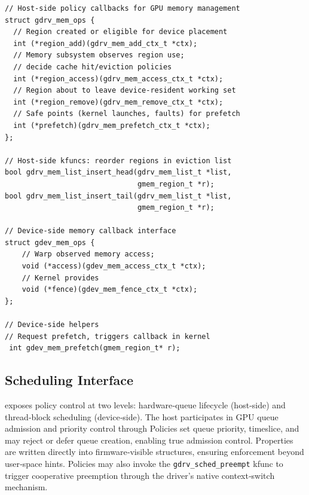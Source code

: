 \begin{verbatim}
// Host-side policy callbacks for GPU memory management
struct gdrv_mem_ops {
  // Region created or eligible for device placement
  int (*region_add)(gdrv_mem_add_ctx_t *ctx);
  // Memory subsystem observes region use;
  // decide cache hit/eviction policies
  int (*region_access)(gdrv_mem_access_ctx_t *ctx);
  // Region about to leave device-resident working set
  int (*region_remove)(gdrv_mem_remove_ctx_t *ctx);
  // Safe points (kernel launches, faults) for prefetch
  int (*prefetch)(gdrv_mem_prefetch_ctx_t *ctx);
};

// Host-side kfuncs: reorder regions in eviction list
bool gdrv_mem_list_insert_head(gdrv_mem_list_t *list,
                               gmem_region_t *r);
bool gdrv_mem_list_insert_tail(gdrv_mem_list_t *list,
                               gmem_region_t *r);

// Device-side memory callback interface
struct gdev_mem_ops {
    // Warp observed memory access;
    void (*access)(gdev_mem_access_ctx_t *ctx);
    // Kernel provides
    void (*fence)(gdev_mem_fence_ctx_t *ctx);
};

// Device-side helpers
// Request prefetch, triggers callback in kernel
 int gdev_mem_prefetch(gmem_region_t* r);
\end{verbatim}




\subsection{Scheduling Interface}
\label{sec:design-sched}

\sys exposes policy control at two levels: hardware‑queue lifecycle (host‑side) and thread‑block scheduling (device‑side). The host participates in GPU queue admission and priority control through Policies set queue priority, timeslice, and may reject or defer queue creation, enabling true admission control. Properties are written directly into firmware‑visible structures, ensuring enforcement beyond user‑space hints. Policies may also invoke the \texttt{gdrv\_sched\_preempt} kfunc to trigger cooperative preemption through the driver’s native context‑switch mechanism.

